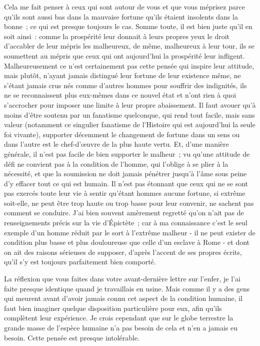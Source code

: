 \documentclass[french,twoside]{book} %
\begin{document}
Cela me fait penser à ceux qui sont autour de vous et que vous méprisez parce qu'ils sont aussi bas dans la mauvaise fortune qu'ils étaient insolents dans la bonne ; ce qui est presque toujours le cas. Somme toute, il est bien juste qu'il en soit ainsi : comme la prospérité leur donnait à leurs propres yeux le droit d'accabler de leur mépris les malheureux, de même, malheureux à leur tour, ils se soumettent au mépris que ceux qui ont aujourd'hui la prospérité leur infligent. Malheureusement ce n'est certainement pas cette pensée qui inspire leur attitude, mais plutôt, n'ayant jamais distingué leur fortune de leur existence même, ne s'étant jamais crus nés comme d'autres hommes pour souffrir des indignités, ils ne se reconnaissent plus eux-mêmes dans ce nouvel état et n'ont rien à quoi s'accrocher pour imposer une limite à leur propre abaissement. Il faut avouer qu'à moins d'être soutenu par un fanatisme quel­conque, qui rend tout facile, mais sans valeur (notamment ce singulier fanatis­me de l'Histoire qui est aujourd'hui la seule foi vivante), supporter décemment le changement de fortune dans un sens ou dans l'autre est le chef-d'œuvre de la plus haute vertu. Et, d'une manière générale, il n'est pas facile de bien supporter le malheur ; vu qu'une attitude de défi ne convient pas à la condition de l'homme, qui l'oblige à se plier à la nécessité, et que la soumission ne doit jamais pénétrer jusqu'à l'âme sous peine d'y effacer tout ce qui est humain. Il n'est pas étonnant que ceux qui ne se sont pas exercés toute leur vie à sentir qu'étant hommes aucune fortune, si extrême soit-elle, ne peut être trop haute ou trop basse pour leur convenir, ne sachent pas comment se conduire. J'ai bien souvent amèrement regretté qu'on n'ait pas de renseignements précis sur la vie d'Épictète ; car à ma connaissance c'est le seul exemple d'un homme réduit par le sort à l'extrême malheur - il ne peut exister de condition plus basse et plus douloureuse que celle d'un esclave à Rome - et dont on ait des raisons sérieuses de supposer, d'après l'accent de ses propres écrits, qu'il s'y est toujours parfaitement bien comporté.\par
La réflexion que vous faites dans votre avant-dernière lettre sur l'enfer, je l'ai faite presque identique quand je travaillais en usine. Mais comme il y a des gens qui meurent avant d'avoir jamais connu cet aspect de la condition humaine, il faut bien imaginer quelque disposition particulière pour eux, afin qu'ils complètent leur expérience. Je crois cependant que sur le globe terrestre la grande masse de l'espèce humaine n'a pas besoin de cela et n'en a jamais eu besoin. Cette pensée est presque intolérable.\par
\end{document}

